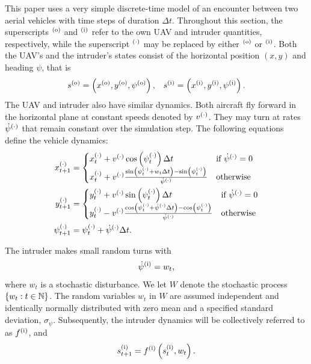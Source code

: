 This paper uses a very simple discrete-time model of an encounter between two aerial vehicles with time steps of duration $\Delta t$. Throughout this section, the superscripts $^{(\mathrm{o})}$ and $^{(\mathrm{i})}$ refer to the own UAV and intruder quantities, respectively, while the superscript $^{(\cdot)}$ may be replaced by either $^{(\mathrm{o})}$ or $^{(\mathrm{i})}$. Both the UAV's and the intruder's states consist of the horizontal position $(x,y)$ and heading $\psi$, that is
\begin{equation}
    s^{(\mathrm{o})} = \left(x^{(\mathrm{o})}, y^{(\mathrm{o})}, \psi^{(\mathrm{o})} \right)\text{,} \quad 
    s^{(\mathrm{i})} = \left(x^{(\mathrm{i})}, y^{(\mathrm{i})}, \psi^{(\mathrm{i})} \right)\text{.}
\end{equation}
The UAV and intruder also have similar dynamics. Both aircraft fly forward in the horizontal plane at constant speeds denoted by $v^{(\cdot)}$. They may turn at rates $\dot{\psi}^{(\cdot)}$ that remain constant over the simulation step. The following equations define the vehicle dynamics: 
\begin{align*}
    x^{(\cdot)}_{t+1} &= \begin{cases}
        x^{(\cdot)}_{t} + v^{(\cdot)} \cos\left(\psi^{(\cdot)}_t\right)\Delta t & \text{if } \dot{\psi}^{(\cdot)} = 0 \\
        x^{(\cdot)}_{t} + v^{(\cdot)} \frac{\sin\left( \psi^{(\cdot)}_t + w_t\Delta t \right) - \sin\left( \psi^{(\cdot)}_t \right)}{\dot{\psi}^{(\cdot)}} & \text{otherwise}\\
    \end{cases} \\
    y^{(\cdot)}_{t+1} &= \begin{cases}
        y^{(\cdot)}_{t} + v^{(\cdot)} \sin\left(\psi^{(\cdot)}_t\right)\Delta t & \text{if } \dot{\psi}^{(\cdot)} = 0 \\
        y^{(\cdot)}_{t} - v^{(\cdot)} \frac{\cos\left(\psi^{(\cdot)}_t + \dot{\psi}^{(\cdot)}\Delta t\right) - \cos\left(\psi^{(\cdot)}_t\right)}{\dot{\psi}^{(\cdot)}} & \text{otherwise}\\
    \end{cases} \\
    \psi^{(\cdot)}_{t+1} &= \psi^{(\cdot)}_t + \dot{\psi}^{(\cdot)} \Delta t \text{.}
\end{align*}

The intruder makes small random turns with
\begin{equation}
    \dot{\psi}^{(\mathrm{i})} = w_t \text{,}
\end{equation}
where $w_t$ is a stochastic disturbance. We let $W$ denote the stochastic process $\{w_t: t\in {\mathbb{N}}\}$. The random variables $w_t$ in $W$ are assumed independent and identically normally distributed with zero mean and a specified standard deviation, $\sigma_{\dot{\psi}}$. Subsequently, the intruder dynamics will be collectively referred to as $f^{(\mathrm{i})}$, and
\begin{equation} \label{eq:idyn}
    s_{t+1}^{(\mathrm{i})} = f^{(\mathrm{i})}\left(s^{(\mathrm{i})}_t, w_t\right) \text{.}
\end{equation}


